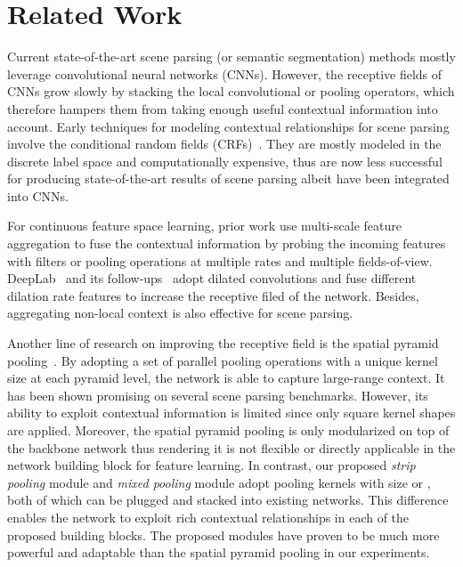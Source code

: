 \documentclass[final]{cvpr}
\begin{document}
\section{Related Work} \label{sec:related_work}

Current state-of-the-art scene parsing (or semantic segmentation) 
methods mostly leverage convolutional neural networks (CNNs).
However, the receptive fields of CNNs grow slowly by stacking the local convolutional or pooling operators, which therefore hampers them from taking enough useful contextual information into account.
Early techniques for modeling contextual relationships for scene parsing involve the conditional random fields (CRFs)~\cite{krahenbuhl2012efficient,vemulapalli2016gaussian,arnab2016higher,zheng2015conditional}.
They are mostly modeled in the discrete label space and computationally expensive, thus are now less successful for producing state-of-the-art results of scene parsing albeit have been integrated into CNNs. 


For continuous feature space learning, prior work use multi-scale feature aggregation \cite{long2015fully,chen2017deeplab,lin2016efficient,hariharan2015hypercolumns,noh2015learning,lin2018multi,lin2017refinenet,badrinarayanan2017segnet,peng2017large,bulo2017loss,tian2019decoders,pami20Res2net} to fuse the contextual information by probing the incoming features with filters or pooling operations at multiple rates and multiple fields-of-view.
DeepLab~\cite{chen2017deeplab,chen2017rethinking} and its follow-ups~\cite{chen2018encoder,yang2018denseaspp,mehta2018espnet} adopt dilated convolutions and fuse different dilation rate features to increase the receptive filed of the network.
Besides, aggregating non-local context \cite{liu2017learning,yuan2018ocnet,li2019expectation,ding2018context,chen2016attention,ren2017end,hong2016learning,yang2014context,zhao2018psanet,huang2018ccnet,ding2019semantic} 
is also effective for scene parsing.


Another line of research on improving the receptive field is the spatial pyramid pooling~\cite{zhao2016pyramid,he2019adaptive}. 
By adopting a set of parallel pooling operations with a unique kernel size at each pyramid level, the network is able to capture large-range context.
It has been shown promising on several scene parsing benchmarks.
However, its ability to exploit contextual information is limited since only square kernel shapes are applied.
Moreover, the spatial pyramid pooling is only modularized on top of the backbone network thus rendering it is not flexible or 
directly applicable in the network building block for feature learning.
In contrast, our proposed \textit{strip pooling} module and \textit{mixed pooling} module adopt pooling kernels with size  or , both of which can be plugged and stacked into existing networks.
This difference enables the network to exploit 
rich contextual relationships in each of the proposed building blocks.
The proposed modules have proven to be much more powerful and adaptable than the spatial pyramid pooling in our experiments.
\end{document}
